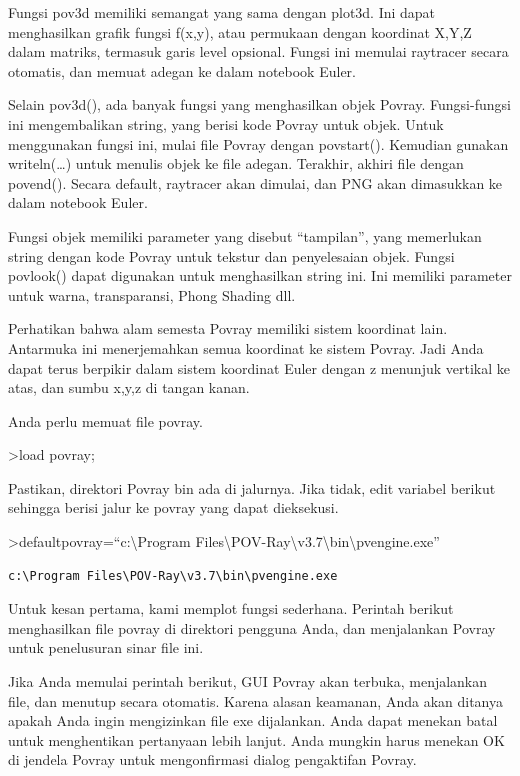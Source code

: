 \documentclass[
]{book}
\begin{document}
Fungsi pov3d memiliki semangat yang sama dengan plot3d. Ini dapat menghasilkan grafik fungsi f(x,y), atau permukaan dengan koordinat X,Y,Z dalam matriks, termasuk garis level opsional. Fungsi ini memulai raytracer secara otomatis, dan memuat adegan ke dalam notebook Euler.

Selain pov3d(), ada banyak fungsi yang menghasilkan objek Povray. Fungsi-fungsi ini mengembalikan string, yang berisi kode Povray untuk objek. Untuk menggunakan fungsi ini, mulai file Povray dengan povstart(). Kemudian gunakan writeln(\ldots) untuk menulis objek ke file adegan. Terakhir, akhiri file dengan povend(). Secara default, raytracer akan dimulai, dan PNG akan dimasukkan ke dalam notebook Euler.

Fungsi objek memiliki parameter yang disebut ``tampilan'', yang memerlukan string dengan kode Povray untuk tekstur dan penyelesaian objek. Fungsi povlook() dapat digunakan untuk menghasilkan string ini. Ini memiliki parameter untuk warna, transparansi, Phong Shading dll.

Perhatikan bahwa alam semesta Povray memiliki sistem koordinat lain. Antarmuka ini menerjemahkan semua koordinat ke sistem Povray. Jadi Anda dapat terus berpikir dalam sistem koordinat Euler dengan z menunjuk vertikal ke atas, dan sumbu x,y,z di tangan kanan.

Anda perlu memuat file povray.

\textgreater load povray;

Pastikan, direktori Povray bin ada di jalurnya. Jika tidak, edit variabel berikut sehingga berisi jalur ke povray yang dapat dieksekusi.

\textgreater defaultpovray=``c:\textbackslash Program Files\textbackslash POV-Ray\textbackslash v3.7\textbackslash bin\textbackslash pvengine.exe''

\begin{verbatim}
c:\Program Files\POV-Ray\v3.7\bin\pvengine.exe
\end{verbatim}

Untuk kesan pertama, kami memplot fungsi sederhana. Perintah berikut menghasilkan file povray di direktori pengguna Anda, dan menjalankan Povray untuk penelusuran sinar file ini.

Jika Anda memulai perintah berikut, GUI Povray akan terbuka, menjalankan file, dan menutup secara otomatis. Karena alasan keamanan, Anda akan ditanya apakah Anda ingin mengizinkan file exe dijalankan. Anda dapat menekan batal untuk menghentikan pertanyaan lebih lanjut. Anda mungkin harus menekan OK di jendela Povray untuk mengonfirmasi dialog pengaktifan Povray.
\end{document}
